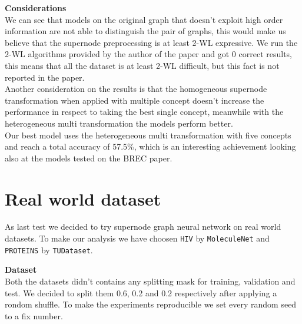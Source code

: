 \documentclass[twoside,11pt]{article}
\begin{document}
\noindent
\textbf{Considerations}\\
We can see that models on the original graph that doesn't exploit high order information are not able to distinguish the pair of graphs, this would make us believe that the supernode preprocessing is at least 2-WL expressive. We run the 2-WL algorithms provided by the author of the paper and got 0 correct results, this means that all the dataset is at least 2-WL difficult, but this fact is not reported in the paper.\\
Another consideration on the results is that the homogeneous supernode transformation when applied with multiple concept doesn't increase the performance in respect to taking the best single concept, meanwhile with the heterogeneous multi transformation the models perform better.\\
Our best model uses the heterogeneous multi transformation with five concepts and reach a total accuracy of 57.5\%, which is an interesting achievement looking also at the models tested on the BREC paper.




\section{Real world dataset} %
\label{sec:real_world_dataset}

As last test we decided to try supernode graph neural network on real world datasets.
To make our analysis we have choosen \texttt{HIV} by \texttt{MoleculeNet} and \texttt{PROTEINS} by \texttt{TUDataset}.

\noindent
\textbf{Dataset}\\
Both the datasets didn't contains any splitting mask for training, validation and test. We decided to split them 0.6, 0.2 and 0.2 respectively after applying a rondom shuffle. To make the experiments reproducible we set every random seed to a fix number.\\

\noindent
{}\\
\end{document}
